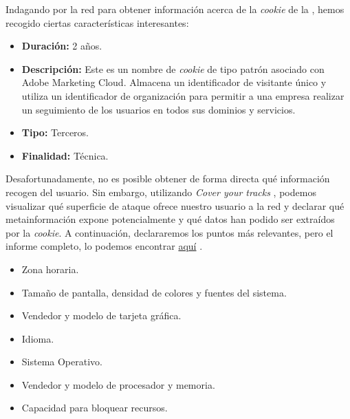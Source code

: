Indagando por la red para obtener información acerca de la \textit{cookie} de la , hemos recogido ciertas características interesantes:
\begin{itemize}
    \item \textbf{Duración:} 2 años.
    \item \textbf{Descripción:} Este es un nombre de \textit{cookie} de tipo patrón asociado con Adobe Marketing Cloud. Almacena un identificador de visitante único y utiliza un identificador de organización para permitir a una empresa realizar un seguimiento de los usuarios en todos sus dominios y servicios.
    \item \textbf{Tipo:} Terceros.
    \item \textbf{Finalidad:} Técnica.
\end{itemize}

Desafortunadamente, no es posible obtener de forma directa qué información recogen del usuario. Sin embargo, utilizando \textit{Cover your tracks} \cite{coveryourtracks}, podemos visualizar qué superficie de ataque ofrece nuestro usuario a la red y declarar qué metainformación expone potencialmente y qué datos han podido ser extraídos por la \textit{cookie}. A continuación, declararemos los puntos más relevantes, pero el informe completo, lo podemos encontrar \href{https://coveryourtracks.eff.org/results?&aat=1&a=1111&t=1111&dnt=1111&fpi_whorls=%7B%22v2%22%3A%7B%22plugins%22%3A%22Plugin+0%3A+Chrome+PDF+Viewer%3B+Portable+Document+Format%3B+internal-pdf-viewer%3B+%28Portable+Document+Format%3B+application%2Fpdf%3B+pdf%29+%28Portable+Document+Format%3B+text%2Fpdf%3B+pdf%29.+Plugin+1%3A+Chromium+PDF+Viewer%3B+Portable+Document+Format%3B+internal-pdf-viewer%3B+%28Portable+Document+Format%3B+application%2Fpdf%3B+pdf%29+%28Portable+Document+Format%3B+text%2Fpdf%3B+pdf%29.+Plugin+2%3A+Microsoft+Edge+PDF+Viewer%3B+Portable+Document+Format%3B+internal-pdf-viewer%3B+%28Portable+Document+Format%3B+application%2Fpdf%3B+pdf%29+%28Portable+Document+Format%3B+text%2Fpdf%3B+pdf%29.+Plugin+3%3A+PDF+Viewer%3B+Portable+Document+Format%3B+internal-pdf-viewer%3B+%28Portable+Document+Format%3B+application%2Fpdf%3B+pdf%29+%28Portable+Document+Format%3B+text%2Fpdf%3B+pdf%29.+Plugin+4%3A+WebKit+built-in+PDF%3B+Portable+Document+Format%3B+internal-pdf-viewer%3B+%28Portable+Document+Format%3B+application%2Fpdf%3B+pdf%29+%28Portable+Document+Format%3B+text%2Fpdf%3B+pdf%29.+%22%2C%22hardware_concurrency%22%3A8%2C%22audio%22%3A%22124.04346607114712%22%2C%22canvas_hash_v2%22%3A%222f48771e4d986bfb8bd4b4bf0872d87b%22%2C%22webgl_hash_v2%22%3A%22d5f1c0e3f5df1e2275ef08aef73bf5b3%22%7D%7D}{aquí} \cite{coveryourtracksreport}.
\begin{itemize}
    \item Zona horaria.
    \item Tamaño de pantalla, densidad de colores y fuentes del sistema.
    \item Vendedor y modelo de tarjeta gráfica.
    \item Idioma.
    \item Sistema Operativo.
    \item Vendedor y modelo de procesador y memoria.
    \item Capacidad para bloquear recursos.
\end{itemize}
